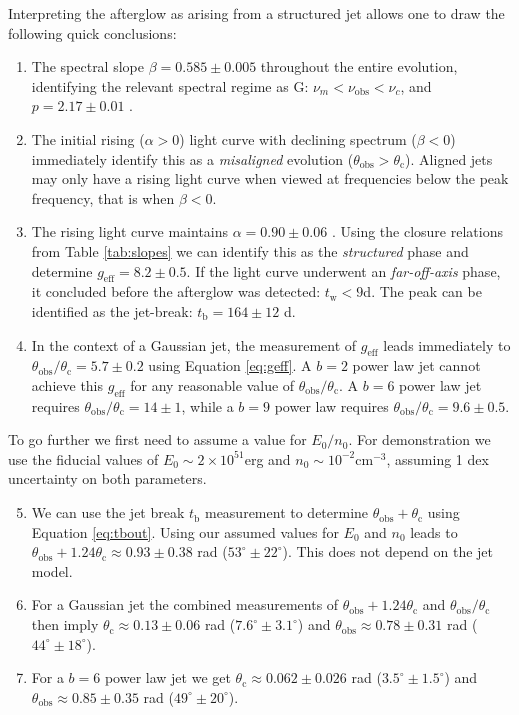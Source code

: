 \documentclass[twocolumn]{aastex62}
\newcommand{\tW}{\ensuremath{t_{\mathrm{w}}}}
\newcommand{\tb}{\ensuremath{t_{\mathrm{b}}}}
\newcommand{\nuobs}{\ensuremath{\nu_{\mathrm{obs}}}}
\newcommand{\thobs}{\ensuremath{\theta_{\mathrm{obs}}}}
\newcommand{\thC}{\ensuremath{\theta_{\mathrm{c}}}}
\newcommand{\geff}{\ensuremath{g_{\mathrm{eff}}}}
\begin{document}
Interpreting the afterglow as arising from a structured jet allows one to draw the following quick conclusions:
\begin{enumerate}
	\item The spectral slope $\beta = 0.585 \pm 0.005$ throughout the entire evolution, identifying the relevant spectral regime as G: $\nu_m < \nuobs < \nu_c$, and $p = 2.17 \pm 0.01$ \citep{Troja:2019ab}.
	\item The initial rising ($\alpha > 0$) light curve with declining spectrum ($\beta < 0$) immediately identify this as a \emph{misaligned} evolution ($\thobs > \thC$).  Aligned jets may only have a rising light curve when viewed at frequencies below the peak frequency, that is when $\beta < 0$.
	\item The rising light curve maintains $\alpha  = 0.90 \pm 0.06$ \citep{Troja:2019ab}.  Using the closure relations from Table \ref{tab:slopes} we can identify this as the \emph{structured} phase and determine $\geff = 8.2 \pm 0.5$.  If the light curve underwent an \emph{far-off-axis} phase, it concluded before the afterglow was detected: $\tW < 9$d.  The peak can be identified as the jet-break: $\tb = 164 \pm 12$ d.
	\item In the context of a Gaussian jet, the measurement of $\geff$ leads immediately to $\thobs / \thC = 5.7 \pm 0.2$ using Equation \eqref{eq:geff}.  A $b=2$ power law jet cannot achieve this $\geff$ for any reasonable value of $\thobs / \thC$.  A $b=6$ power law jet requires $\thobs/\thC = 14 \pm 1$, while a $b=9$ power law requires $\thobs/\thC = 9.6\pm 0.5$.
\end{enumerate}
To go further we first need to assume a value for $E_0 / n_0$. For demonstration we use the \citet{Fong:2015aa} fiducial values of $E_0 \sim 2\times 10^{51}$erg and $n_0 \sim 10^{-2}$cm$^{-3}$, assuming 1 dex uncertainty on both parameters.
\begin{enumerate}
	\setcounter{enumi}{4}
	\item We can use the jet break $\tb$ measurement to determine $\thobs + \thC$ using Equation \eqref{eq:tbout}. Using our assumed values for  $E_0$ and $n_0$ leads to $\thobs + 1.24 \thC \approx 0.93 \pm 0.38$ rad ($53^\circ \pm 22^\circ$). This does not depend on the jet model.
	\item For a Gaussian jet the combined measurements of $\thobs +1.24\thC$ and $\thobs/\thC$ then imply $\thC \approx 0.13 \pm 0.06$ rad ($7.6^\circ  \pm 3.1^\circ$) and $\thobs \approx 0.78 \pm 0.31$ rad ($44^\circ \pm 18^\circ$).
	\item For a $b=6$ power law jet we get $\thC \approx 0.062 \pm 0.026$ rad ($3.5^\circ  \pm 1.5^\circ$) and $\thobs \approx 0.85 \pm 0.35$ rad ($49^\circ \pm 20^\circ$).
\end{enumerate}
\end{document}

